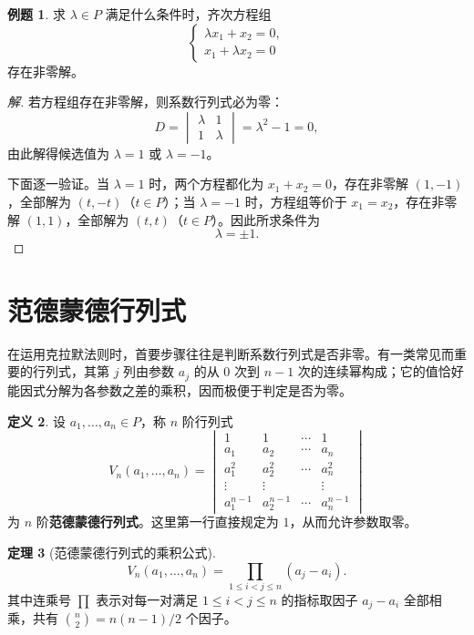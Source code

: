 \documentclass[UTF8, fontset=fandol, a4paper, 12pt]{ctexart}
\theoremstyle{definition}
\newtheorem{definition}{定义}[section]
\newtheorem{theorem}[definition]{定理}
\newtheorem{example}[definition]{例题}
\begin{document}
\begin{example}
求 $\lambda\in P$ 满足什么条件时，齐次方程组
\[
 \begin{cases}
 \lambda x_1+x_2=0,\\
 x_1+\lambda x_2=0
 \end{cases}
\]
存在非零解。
\end{example}
\begin{proof}[解]
若方程组存在非零解，则系数行列式必为零：
\[
 D=\begin{vmatrix}\lambda&1\\1&\lambda\end{vmatrix}
 =\lambda^2-1=0,
\]
由此解得候选值为 $\lambda=1$ 或 $\lambda=-1$。

下面逐一验证。当 $\lambda=1$ 时，两个方程都化为 $x_1+x_2=0$，存在非零解 $(1,-1)$，全部解为 $(t,-t)$（$t\in P$）；当 $\lambda=-1$ 时，方程组等价于 $x_1=x_2$，存在非零解 $(1,1)$，全部解为 $(t,t)$（$t\in P$）。因此所求条件为
\[
 \boxed{\lambda=\pm1.}
\]
\end{proof}

\section{范德蒙德行列式}

在运用克拉默法则时，首要步骤往往是判断系数行列式是否非零。有一类常见而重要的行列式，其第 $j$ 列由参数 $a_j$ 的从 $0$ 次到 $n-1$ 次的连续幂构成；它的值恰好能因式分解为各参数之差的乘积，因而极便于判定是否为零。

\begin{definition}
设 $a_1,\ldots,a_n\in P$，称 $n$ 阶行列式
\[
 V_n(a_1,\ldots,a_n)=
 \begin{vmatrix}
 1&1&\cdots&1\\
 a_1&a_2&\cdots&a_n\\
 a_1^2&a_2^2&\cdots&a_n^2\\
 \vdots&\vdots&&\vdots\\
 a_1^{n-1}&a_2^{n-1}&\cdots&a_n^{n-1}
 \end{vmatrix}
\]
为 $n$ 阶\textbf{范德蒙德行列式}。这里第一行直接规定为 $1$，从而允许参数取零。
\end{definition}

\begin{theorem}[范德蒙德行列式的乘积公式]
\[
 \boxed{V_n(a_1,\ldots,a_n)=\prod_{1\le i<j\le n}(a_j-a_i).}
\]
其中连乘号 $\prod$ 表示对每一对满足 $1\le i<j\le n$ 的指标取因子 $a_j-a_i$ 全部相乘，共有 $\binom n2=n(n-1)/2$ 个因子。
\end{theorem}
\end{document}
